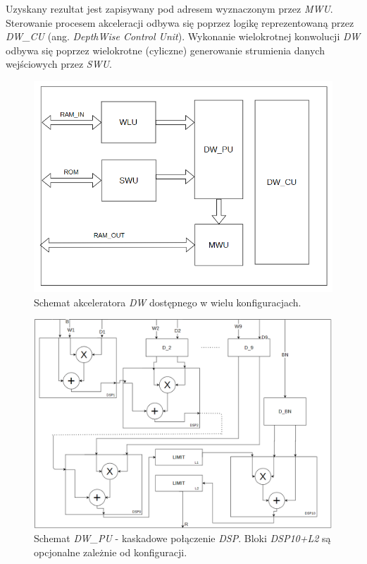 Uzyskany rezultat jest zapisywany pod adresem wyznaczonym przez \emph{MWU}.
Sterowanie procesem akceleracji odbywa się poprzez logikę reprezentowaną przez \emph{DW\_CU} (ang. \emph{DepthWise Control Unit}).
Wykonanie wielokrotnej konwolucji \emph{DW} odbywa się poprzez wielokrotne (cyliczne) generowanie strumienia danych wejściowych przez \emph{SWU}.
\begin{figure}
    \centering
    \includegraphics[width=0.9\linewidth]{images/DWACC.png}
    \caption{Schemat akceleratora \emph{DW} dostępnego w wielu konfiguracjach.}
    \label{fig:dwacc}
\end{figure}
\begin{figure}
    \centering
    \includegraphics[width=0.9\linewidth]{images/DW_PU.png}
    \caption{Schemat \emph{DW\_PU} - kaskadowe połączenie \emph{DSP}.
    Bloki \emph{DSP10+L2} są opcjonalne zależnie od konfiguracji.}
    \label{fig:dwpu}
\end{figure}

